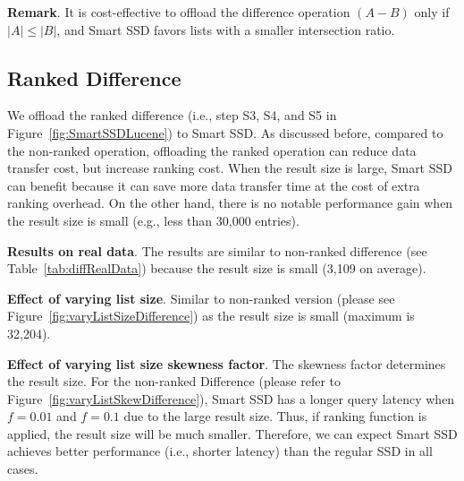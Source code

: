 \textbf{Remark}. It is cost-effective to offload the \textsf{difference} operation $(A-B)$ only if $|A| \le |B|$, and Smart SSD favors lists with a smaller intersection ratio.

\subsection{Ranked Difference}\label{sec:expRankedDifference}
We offload the \textsf{ranked difference} (i.e., step S3, S4, and S5 in Figure~\ref{fig:SmartSSDLucene}) to Smart SSD.
As discussed before, compared to the non-ranked operation, offloading the ranked operation can reduce data transfer cost, but increase ranking cost. When the result size is large, Smart SSD can benefit because it can save more data transfer time at the cost of extra ranking overhead. On the other hand, there is no notable performance gain when the result size is small (e.g., less than 30,000 entries).

\textbf{Results on real data}.
The results are similar to non-ranked difference (see Table~\ref{tab:diffRealData}) because the result size is small (3,109 on average).



\textbf{Effect of varying list size}.
Similar to non-ranked version (please see Figure~\ref{fig:varyListSizeDifference}) as the result size is small (maximum is 32,204).

\textbf{Effect of varying list size skewness factor}.
The skewness factor determines the result size. For the non-ranked Difference (please refer to Figure~\ref{fig:varyListSkewDifference}),
Smart SSD has a longer query latency when $f=0.01$ and $f=0.1$ due to the large result size. Thus, if ranking function is applied, the result size will be much smaller. Therefore, we can expect Smart SSD achieves better performance (i.e., shorter latency) than the regular SSD in all cases.

